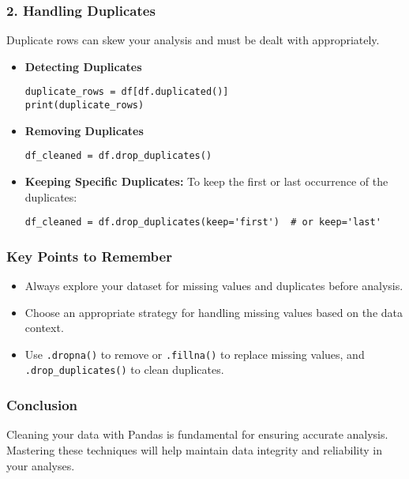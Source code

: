 \documentclass[aspectratio=169]{beamer}
\begin{document}
\begin{frame}[fragile]
    \frametitle{2. Handling Duplicates}
    Duplicate rows can skew your analysis and must be dealt with appropriately.

    \begin{itemize}
        \item \textbf{Detecting Duplicates}
        \begin{lstlisting}
duplicate_rows = df[df.duplicated()]
print(duplicate_rows)
        \end{lstlisting}
        
        \item \textbf{Removing Duplicates}
        \begin{lstlisting}
df_cleaned = df.drop_duplicates()
        \end{lstlisting}
        
        \item \textbf{Keeping Specific Duplicates:}
        To keep the first or last occurrence of the duplicates:
        \begin{lstlisting}
df_cleaned = df.drop_duplicates(keep='first')  # or keep='last'
        \end{lstlisting}
    \end{itemize}
\end{frame}

\begin{frame}
    \frametitle{Key Points to Remember}
    \begin{block}{}
        \begin{itemize}
            \item Always explore your dataset for missing values and duplicates before analysis.
            \item Choose an appropriate strategy for handling missing values based on the data context.
            \item Use \texttt{.dropna()} to remove or \texttt{.fillna()} to replace missing values, and \texttt{.drop_duplicates()} to clean duplicates.
        \end{itemize}
    \end{block}
\end{frame}

\begin{frame}
    \frametitle{Conclusion}
    Cleaning your data with Pandas is fundamental for ensuring accurate analysis. Mastering these techniques will help maintain data integrity and reliability in your analyses.
\end{frame}
\end{document}
